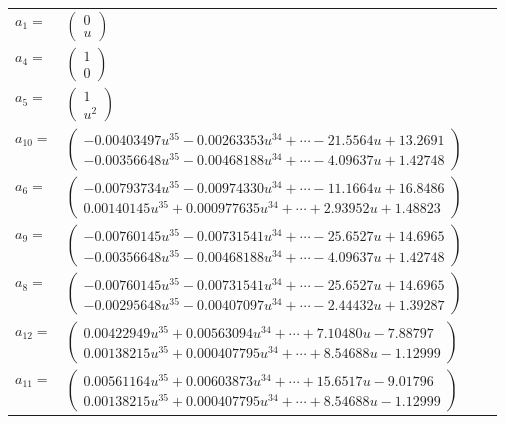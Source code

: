 \documentclass[1p]{elsarticle_modified}
\theoremstyle{definition}
\begin{document}
\begin{tabular}{m{7pt} m{180pt} m{7pt} m{180pt} }
\flushright $a_{1}=$&$\begin{pmatrix}0\\u\end{pmatrix}$ \\
\flushright $a_{4}=$&$\begin{pmatrix}1\\0\end{pmatrix}$ \\
\flushright $a_{5}=$&$\begin{pmatrix}1\\u^2\end{pmatrix}$ \\
\flushright $a_{10}=$&$\begin{pmatrix}-0.00403497 u^{35}-0.00263353 u^{34}+\cdots-21.5564 u+13.2691\\-0.00356648 u^{35}-0.00468188 u^{34}+\cdots-4.09637 u+1.42748\end{pmatrix}$ \\
\flushright $a_{6}=$&$\begin{pmatrix}-0.00793734 u^{35}-0.00974330 u^{34}+\cdots-11.1664 u+16.8486\\0.00140145 u^{35}+0.000977635 u^{34}+\cdots+2.93952 u+1.48823\end{pmatrix}$ \\
\flushright $a_{9}=$&$\begin{pmatrix}-0.00760145 u^{35}-0.00731541 u^{34}+\cdots-25.6527 u+14.6965\\-0.00356648 u^{35}-0.00468188 u^{34}+\cdots-4.09637 u+1.42748\end{pmatrix}$ \\
\flushright $a_{8}=$&$\begin{pmatrix}-0.00760145 u^{35}-0.00731541 u^{34}+\cdots-25.6527 u+14.6965\\-0.00295648 u^{35}-0.00407097 u^{34}+\cdots-2.44432 u+1.39287\end{pmatrix}$ \\
\flushright $a_{12}=$&$\begin{pmatrix}0.00422949 u^{35}+0.00563094 u^{34}+\cdots+7.10480 u-7.88797\\0.00138215 u^{35}+0.000407795 u^{34}+\cdots+8.54688 u-1.12999\end{pmatrix}$ \\
\flushright $a_{11}=$&$\begin{pmatrix}0.00561164 u^{35}+0.00603873 u^{34}+\cdots+15.6517 u-9.01796\\0.00138215 u^{35}+0.000407795 u^{34}+\cdots+8.54688 u-1.12999\end{pmatrix}$ \\

\end{tabular}
\end{document}
